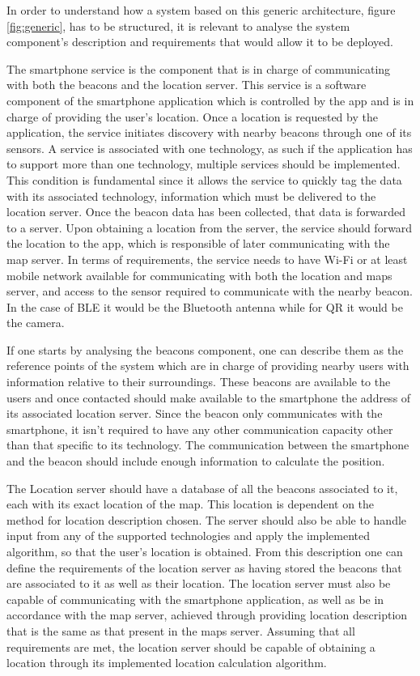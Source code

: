  
In order to understand how a system based on this generic architecture, figure \ref{fig:generic}, has to be structured, it is relevant to analyse the system component's description and requirements that would allow it to be deployed.  
 
 
The smartphone service is the component that is in charge of communicating with both the beacons and the location server. This service is a software component of the smartphone application which is controlled by the app and is in charge of providing the user's location. Once a location is requested by the application, the service initiates discovery with nearby beacons through one of its sensors. A service is associated with one technology, as such if the application has to support more than one technology, multiple services should be implemented. This condition is fundamental since it allows the service to quickly tag the data with its associated technology, information which must be delivered to the location server. Once the beacon data has been collected, that data is forwarded to a server. Upon obtaining a location from the server, the service should forward the location to the app, which is responsible of later communicating with the map server. In terms of requirements, the service needs to have Wi-Fi or at least mobile network available for communicating with both the location and maps server, and access to the sensor required to communicate with the nearby beacon. In the case of BLE it would be the Bluetooth antenna while for QR it would be the camera. 
 
 
If one starts by analysing the beacons component, one can describe them as the reference points of the system which are in charge of providing nearby users with information relative to their surroundings. These beacons are available to the users and once contacted should make available to the smartphone the address of its associated location server. Since the beacon only communicates with the smartphone, it isn't required to have any other communication capacity other than that specific to its technology. The communication between the smartphone and the beacon should include enough information to calculate the position. 
 
 
The Location server should have a database of all the beacons associated to it, each with its exact location of the map. This location is dependent on the method for location description chosen. The server should also be able to handle input from any of the supported technologies and apply the implemented algorithm, so that the user's location is obtained. From this description one can define the requirements of the location server as having stored the beacons that are associated to it as well as their location. The location server must also be capable of communicating with the smartphone application, as well as be in accordance with the map server, achieved through providing location description that is the same as that present in the maps server. Assuming that all requirements are met, the location server should be capable of obtaining a location through its implemented location calculation algorithm. 
 
